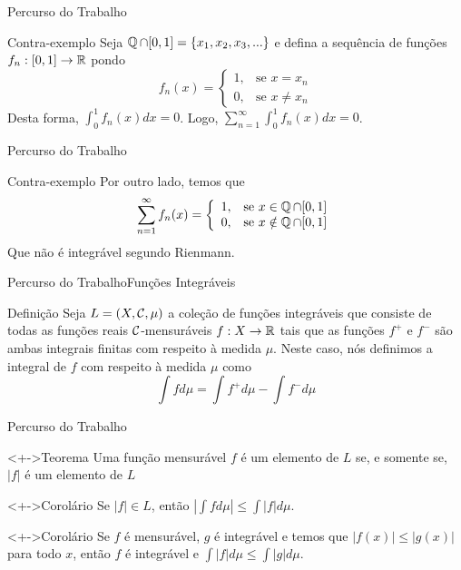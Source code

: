 	\begin{frame}{Percurso do Trabalho}
		\begin{block}{Contra-exemplo}
			\justify Seja $\operatorname{\mathbb{Q}} \cap [0,1] = \{x_1, x_2, x_3, ...\}$ e defina a sequência de funções $f_n: [0,1] \to \operatorname{\mathbb{R}}$ pondo 
			$$f_n(x) = \left\{\begin{array}{ll}
				1, & \text{se\ } x = x_n\\
				0, & \text{se\ } x \neq x_n
			\end{array}\right.$$
			Desta forma, $\displaystyle \int_{0}^{1} f_n(x)dx = 0$.
			Logo, $\displaystyle \sum_{n = 1}^\infty \int_{0}^{1} f_n(x)dx = 0$.
		\end{block}
	\end{frame}
	\begin{frame}{Percurso do Trabalho}
		\begin{block}{Contra-exemplo}
			\justify Por outro lado, temos que
			$$\sum_{n = 1}^\infty f_n(x) = \left\{\begin{array}{ll}
				1, & \text{se\ } x \in \operatorname{\mathbb{Q}} \cap [0,1]\\
				0, & \text{se\ } x \notin \operatorname{\mathbb{Q}} \cap [0,1]
			\end{array}\right.$$
			Que não é integrável segundo Rienmann.
		\end{block}
	\end{frame}

	\begin{frame}{Percurso do Trabalho}{Funções Integráveis}
		\begin{block}{Definição}
			\justify Seja $L = (X, \operatorname{\mathcal{C}}, \mu)$ a coleção de funções integráveis que consiste de todas as funções reais $\operatorname{\mathcal{C}}$-mensuráveis $f:X \to \operatorname{\mathbb{R}}$ tais que as funções
			$f^+$ e $f^-$ são ambas integrais finitas com respeito à medida $\mu$.
			Neste caso, nós definimos a integral de $f$ com respeito à medida $\mu$ como
			$$
			\int fd\mu
			= \int f^+ d\mu - \int f^- d\mu
			$$
		\end{block}
	\end{frame}
	
	\begin{frame}{Percurso do Trabalho}
		\begin{block}<+->{Teorema}
			\justify Uma função mensurável $f$ é um elemento de $L$ se, e somente se, $|f|$ é um elemento de $L$
		\end{block}
		\begin{block}<+->{Corolário}
			\justify Se $|f| \in L$, então $\displaystyle \left|\int f d\mu\right| \leq \int |f| d\mu$.
		\end{block}
		\begin{block}<+->{Corolário}
			\justify Se $f$ é mensurável, $g$ é integrável e temos que $|f(x)| \leq |g(x)|$ para todo $x$, então  $f$ é integrável e $\displaystyle \int |f| d\mu \leq \int |g| d\mu$.
		\end{block}
	\end{frame}


